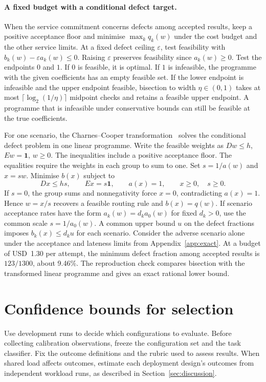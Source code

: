 \documentclass[11pt,reqno]{amsart}
\theoremstyle{definition}
\theoremstyle{remark}
\begin{document}
\paragraph{A fixed budget with a conditional defect target.}
When the service commitment concerns defects among accepted results, keep a positive acceptance floor and minimise \(\max_k q_k(w)\) under the cost budget and the other service limits. At a fixed defect ceiling \(\varepsilon\), test feasibility with \(b_k(w)-\varepsilon a_k(w)\le0\). Raising \(\varepsilon\) preserves feasibility since \(a_k(w)\ge0\). Test the endpoints \(0\) and \(1\). If \(0\) is feasible, it is optimal. If \(1\) is infeasible, the programme with the given coefficients has an empty feasible set. If the lower endpoint is infeasible and the upper endpoint feasible, bisection to width \(\eta\in(0,1)\) takes at most \(\lceil\log_2(1/\eta)\rceil\) midpoint checks and retains a feasible upper endpoint. A programme that is infeasible under conservative bounds can still be feasible at the true coefficients.

For one scenario, the Charnes--Cooper transformation~\cite{boyd,charnesCooper} solves the conditional defect problem in one linear programme. Write the feasible weights as \(Dw\le h\), \(Ew=\mathbf1\), \(w\ge0\). The inequalities include a positive acceptance floor. The equalities require the weights in each group to sum to one. Set \(s=1/a(w)\) and \(x=sw\). Minimise \(b(x)\) subject to
\[
 Dx\le hs,\qquad Ex=s\mathbf1,\qquad a(x)=1,\qquad x\ge0,\quad s\ge0 .
\]
If \(s=0\), the group sums and nonnegativity force \(x=0\), contradicting \(a(x)=1\). Hence \(w=x/s\) recovers a feasible routing rule and \(b(x)=q(w)\). If scenario acceptance rates have the form \(a_k(w)=d_k a_0(w)\) for fixed \(d_k>0\), use the common scale \(s=1/a_0(w)\). A common upper bound \(u\) on the defect fractions imposes \(b_k(x)\le d_ku\) for each scenario. Consider the adverse scenario alone under the acceptance and lateness limits from Appendix~\ref{app:exact}. At a budget of USD~1.30 per attempt, the minimum defect fraction among accepted results is \(123/1300\), about 9.46\%. The reproduction check compares bisection with the transformed linear programme and gives an exact rational lower bound.

\section{Confidence bounds for selection}
\label{sec:calibration}

Use development runs to decide which configurations to evaluate. Before collecting calibration observations, freeze the configuration set and the task classifier. Fix the outcome definitions and the rubric used to assess results. When shared load affects outcomes, estimate each deployment design's outcomes from independent workload runs, as described in Section~\ref{sec:discussion}.
\end{document}
